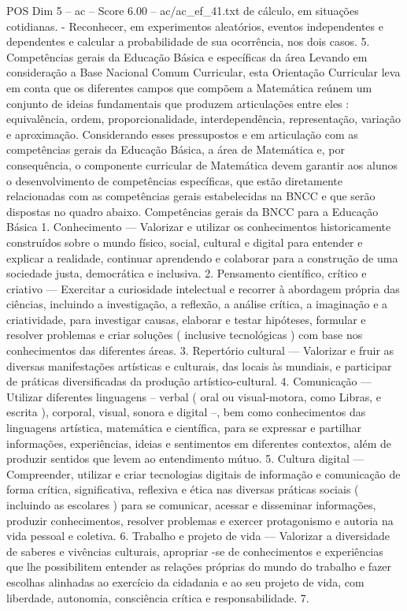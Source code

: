 \begin{textsample}{POS Dim 5 – ac – Score 6.00 – ac/ac\_ef\_41.txt}
de cálculo, em situações cotidianas. - Reconhecer, em experimentos aleatórios, eventos independentes e dependentes e calcular a probabilidade de sua ocorrência, nos dois casos. 5.
Competências gerais da Educação Básica e específicas da área Levando em consideração a Base Nacional Comum Curricular, esta Orientação Curricular leva em conta que os diferentes campos que compõem a Matemática reúnem um conjunto de ideias fundamentais que produzem articulações entre eles : equivalência, ordem, proporcionalidade, interdependência, representação, variação e aproximação.
Considerando esses pressupostos e em articulação com as competências gerais da Educação Básica, a área de Matemática e, por consequência, o componente curricular de Matemática devem garantir aos alunos o desenvolvimento de competências específicas, que estão diretamente relacionadas com as competências gerais estabelecidas na BNCC e que serão dispostas no quadro abaixo.
Competências gerais da BNCC para a Educação Básica 1.
Conhecimento — Valorizar e utilizar os conhecimentos historicamente construídos sobre o mundo físico, social, cultural e digital para entender e explicar a realidade, continuar aprendendo e colaborar para a construção de uma sociedade justa, democrática e inclusiva. 2.
Pensamento científico, crítico e criativo — Exercitar a curiosidade intelectual e recorrer à abordagem própria das ciências, incluindo a investigação, a reflexão, a análise crítica, a imaginação e a criatividade, para investigar causas, elaborar e testar hipóteses, formular e resolver problemas e criar soluções ( inclusive tecnológicas ) com base nos conhecimentos das diferentes áreas. 3.
Repertório cultural — Valorizar e fruir as diversas manifestações artísticas e culturais, das locais às mundiais, e participar de práticas diversificadas da produção artístico-cultural. 4.
Comunicação — Utilizar diferentes linguagens – verbal ( oral ou visual-motora, como Libras, e escrita ), corporal, visual, sonora e digital –, bem como conhecimentos das linguagens artística, matemática e científica, para se expressar e partilhar informações, experiências, ideias e sentimentos em diferentes contextos, além de produzir sentidos que levem ao entendimento mútuo. 5.
Cultura digital — Compreender, utilizar e criar tecnologias digitais de informação e comunicação de forma crítica, significativa, reflexiva e ética nas diversas práticas sociais ( incluindo as escolares ) para se comunicar, acessar e disseminar informações, produzir conhecimentos, resolver problemas e exercer protagonismo e autoria na vida pessoal e coletiva. 6.
Trabalho e projeto de vida — Valorizar a diversidade de saberes e vivências culturais, apropriar -se de conhecimentos e experiências que lhe possibilitem entender as relações próprias do mundo do trabalho e fazer escolhas alinhadas ao exercício da cidadania e ao seu projeto de vida, com liberdade, autonomia, consciência crítica e responsabilidade. 7.

\end{textsample}
